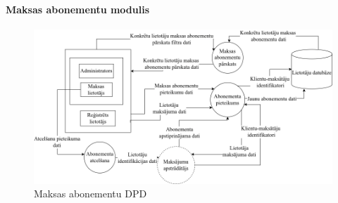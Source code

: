 \paragraph{Maksas abonementu modulis}

\begin{figure}[htbp]
	\centering
	\includegraphics[width=\linewidth]{./src/img/MaksasAbonementaModuls.png}
	\caption{Maksas abonementu DPD}
	\label{fig:dpd-2-premium-user}
\end{figure}




